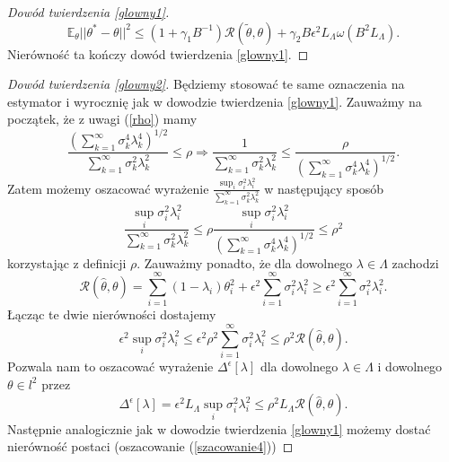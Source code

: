 \documentclass[man,mfiu]{mgrwms}
\begin{document}
\begin{proof}[Dowód twierdzenia \ref{glowny1}]
\begin{displaymath}
\mathbb{E}_{\theta}||\theta^*-\theta||^2\leq (1+\gamma_1B^{-1})\mathcal{R}(\tilde{\theta},\theta)+\gamma_2B\epsilon^2L_{\Lambda}\omega (B^2L_{\Lambda}).
\end{displaymath}
Nierówność ta kończy dowód twierdzenia \ref{glowny1}.
\end{proof}

\begin{proof}[Dowód twierdzenia \ref{glowny2}]
Będziemy stosować te same oznaczenia na estymator i wyrocznię jak w dowodzie twierdzenia \ref{glowny1}. Zauważmy na początek, że z uwagi (\ref{rho}) mamy 
\begin{displaymath}
\frac{\left(\sum_{k=1}^{\infty}\sigma_k^4\lambda_k^4\right)^{1/2}}{\sum_{k=1}^{\infty}\sigma_k^2\lambda_k^2}\leq \rho \Longrightarrow \frac{1}{\sum_{k=1}^{\infty}\sigma_k^2\lambda_k^2}\leq \frac{\rho}{\left(\sum_{k=1}^{\infty}\sigma_k^4\lambda_k^4\right)^{1/2}}.
\end{displaymath}
Zatem możemy oszacować wyrażenie $\frac{\sup_i \sigma_i^2\lambda_i^2}{\sum_{k=1}^{\infty}\sigma_k^2\lambda_k^2}$ w następujący sposób
\begin{displaymath}
\frac{\sup_i \sigma_i^2\lambda_i^2}{\sum_{k=1}^{\infty}\sigma_k^2\lambda_k^2}\leq \rho \frac{\sup_i \sigma_i^2\lambda_i^2}{\left(\sum_{k=1}^{\infty}\sigma_k^4\lambda_k^4\right)^{1/2}}\leq \rho^2
\end{displaymath}
korzystając z definicji $\rho$. Zauważmy ponadto, że dla dowolnego $\lambda\in \Lambda$ zachodzi
\begin{displaymath}
\mathcal{R}(\hat{\theta},\theta)=\sum_{i=1}^{\infty}(1-\lambda_i)\theta^2_i+\epsilon^2\sum_{i=1}^{\infty}\sigma_i^2\lambda_i^2\geq \epsilon^2\sum_{i=1}^{\infty}\sigma_i^2\lambda_i^2.
\end{displaymath}
Łącząc te dwie nierówności dostajemy
\begin{displaymath}
\epsilon^2\sup_i \sigma_i^2\lambda_i^2\leq \epsilon^2\rho^2\sum_{i=1}^{\infty}\sigma_i^2\lambda_i^2\leq \rho^2\mathcal{R}(\hat{\theta},\theta).
\end{displaymath}
Pozwala nam to oszacować wyrażenie $\Delta^{\epsilon}[\lambda]$ dla dowolnego $\lambda\in \Lambda$ i dowolnego $\theta\in l^2$ przez
\begin{displaymath}
\Delta^{\epsilon}[\lambda]=\epsilon^2L_{\Lambda}\sup_i \sigma_i^2\lambda_i^2\leq \rho^2L_{\Lambda}\mathcal{R}(\hat{\theta},\theta).
\end{displaymath}
Następnie analogicznie jak w dowodzie twierdzenia \ref{glowny1} możemy dostać nierówność postaci (oszacowanie (\ref{szacowanie4}))

\end{proof}
\end{document}
